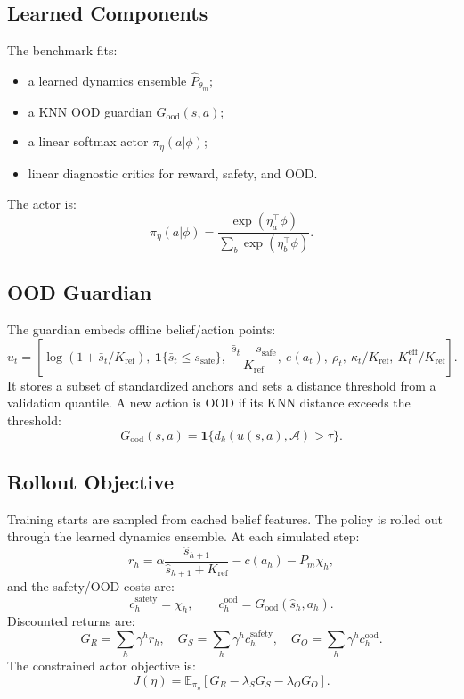 \documentclass[11pt]{article}
\newcommand{\E}{\mathbb{E}}
\newcommand{\1}{\mathbf{1}}
\begin{document}
\subsection{Learned Components}

The benchmark fits:
\begin{itemize}[leftmargin=*]
  \item a learned dynamics ensemble $\hat{P}_{\theta_m}$;
  \item a KNN OOD guardian $G_{\mathrm{ood}}(s,a)$;
  \item a linear softmax actor $\pi_\eta(a|\phi)$;
  \item linear diagnostic critics for reward, safety, and OOD.
\end{itemize}

The actor is:
\[
  \pi_\eta(a|\phi)=
  \frac{\exp(\eta_a^\top \phi)}
       {\sum_b\exp(\eta_b^\top \phi)}.
\]

\subsection{OOD Guardian}

The guardian embeds offline belief/action points:
\[
  u_t=\left[
  \log(1+\bar{s}_t/K_{\mathrm{ref}}),\
  \1\{\bar{s}_t\le s_{\mathrm{safe}}\},\
  \frac{\bar{s}_t-s_{\mathrm{safe}}}{K_{\mathrm{ref}}},\
  e(a_t),\
  \rho_t,\ \kappa_t/K_{\mathrm{ref}},\
  K^{\mathrm{eff}}_t/K_{\mathrm{ref}}
  \right].
\]
It stores a subset of standardized anchors and sets a distance threshold from a
validation quantile.  A new action is OOD if its KNN distance exceeds the
threshold:
\[
  G_{\mathrm{ood}}(s,a)=
  \1\{d_k(u(s,a),\mathcal{A})>\tau\}.
\]

\subsection{Rollout Objective}

Training starts are sampled from cached belief features.  The policy is rolled
out through the learned dynamics ensemble.  At each simulated step:
\[
  r_h =
  \alpha\frac{\hat{s}_{h+1}}{\hat{s}_{h+1}+K_{\mathrm{ref}}}
  -c(a_h)
  -P_m\chi_h,
\]
and the safety/OOD costs are:
\[
  c^{\mathrm{safety}}_h=\chi_h,\qquad
  c^{\mathrm{ood}}_h=G_{\mathrm{ood}}(\hat{s}_h,a_h).
\]
Discounted returns are:
\[
  G_R=\sum_h\gamma^h r_h,\quad
  G_S=\sum_h\gamma^h c^{\mathrm{safety}}_h,\quad
  G_O=\sum_h\gamma^h c^{\mathrm{ood}}_h.
\]
The constrained actor objective is:
\[
  J(\eta)=
  \E_{\pi_\eta}\left[
    G_R-\lambda_SG_S-\lambda_OG_O
  \right].
\]
\end{document}
